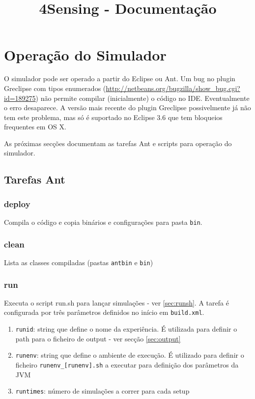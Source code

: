 \documentclass{article}
\newcommand{\tm}[1]{\texttt{#1}}
\begin{document}
\title{4Sensing - Documentação}
\maketitle

\section{Operação do Simulador}

O simulador pode ser operado a partir do Eclipse ou Ant. Um bug no plugin Greclipse com tipos enumerados (\url{http://netbeans.org/bugzilla/show_bug.cgi?id=189275}) não permite compilar (inicialmente) o código no IDE.  Eventualmente o erro desaparece.  A versão mais recente do plugin Greclipse possivelmente já não tem este problema, mas só é suportado no Eclipse 3.6 que tem bloqueios frequentes em OS X.

As próximas secções  documentam as tarefas Ant e scripts para operação do simulador.

\subsection{Tarefas Ant}

\subsubsection{deploy}
Compila o código e copia binários e configurações para pasta \tm{bin}.

\subsubsection{clean}
Lista as classes compiladas (pastas \tm{antbin} e \tm{bin})

\subsubsection{run}\label{sec:taskrun}
Executa o script run.sh para lançar simulações - ver \ref{sec:runsh}. A tarefa é configurada por três parâmetros definidos no início em \tm{build.xml}.

\begin{enumerate}
\item \tm{runid}: string que define o nome da experiência. É utilizada para definir o path para o ficheiro de output  - ver secção \ref{sec:output}
\item \tm{runenv}: string que define o ambiente de execução. É utilizado para definir o ficheiro \tm{runenv\_[runenv].sh} a executar para definição dos parâmetros da JVM
\item \tm{runtimes}: número de simulações a correr para cada setup
\end{enumerate}
\end{document}
